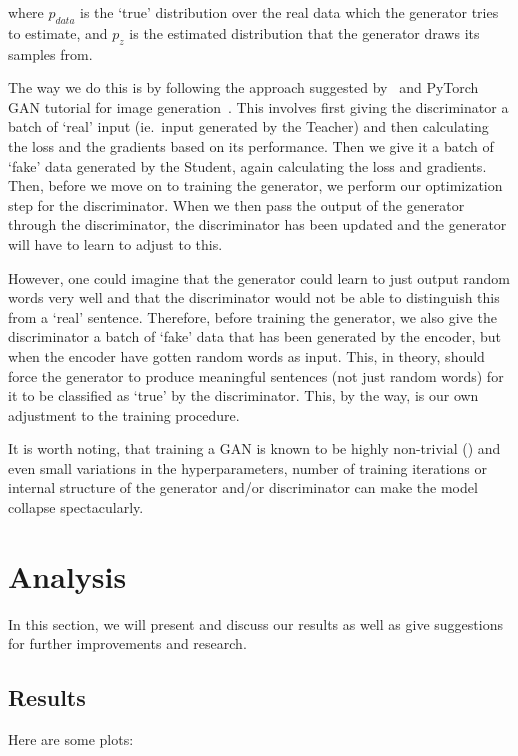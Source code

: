\documentclass{article}
\begin{document}
where $p_{data}$ is the `true' distribution over the real data which the
generator tries to estimate, and $p_z$ is the estimated distribution that the
generator draws its samples from.

The way we do this is by following the approach suggested
by~\cite{Goodfellow2014GenerativeAN} and PyTorch GAN tutorial for image
generation~\cite{pytorchTutorialGAN}. This involves first giving the
discriminator a batch of `real' input (ie.\ input generated by the Teacher) and
then calculating the loss and the gradients based on its performance. Then we
give it a batch of `fake' data generated by the Student, again calculating the
loss and gradients. Then, before we move on to training the generator, we
perform our optimization step for the discriminator. When we then pass the
output of the generator through the discriminator, the discriminator has been
updated and the generator will have to learn to adjust to this. 

However, one could imagine that the generator could learn to just output random
words very well and that the discriminator would not be able to distinguish this
from a `real' sentence. Therefore, before training the generator, we also give
the discriminator a batch of `fake' data that has been generated by the encoder,
but when the encoder have gotten random words as input. This, in theory, should
force the generator to produce meaningful sentences (not just random words) for
it to be classified as `true' by the discriminator. This, by the way, is our own
adjustment to the training procedure.

It is worth noting, that training a GAN is known to be highly non-trivial
(\cite{Hui2018}) and even small variations in the hyperparameters, number of training
iterations or internal structure of the generator and/or discriminator can make
the model collapse spectacularly.

\section{Analysis}\label{sec:analysis}

In this section, we will present and discuss our results as well as give
suggestions for further improvements and research.

\subsection{Results}\label{sec:results}

Here are some plots:
\end{document}
